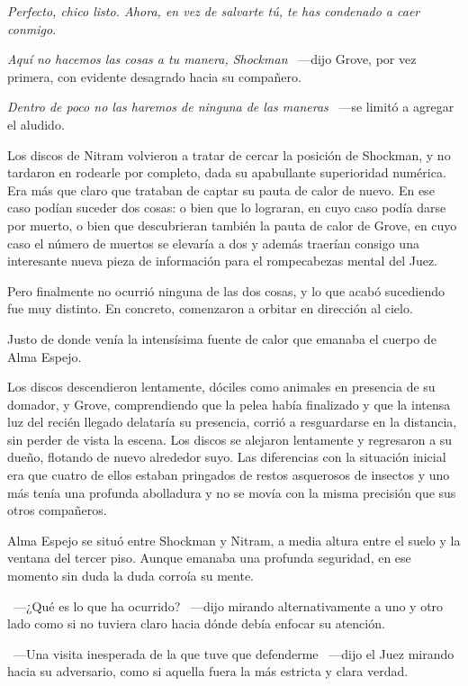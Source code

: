 \emph{Perfecto, chico listo. Ahora, en vez de salvarte tú, te has condenado a caer conmigo.}

\emph{Aquí no hacemos las cosas a tu manera, Shockman} ~---dijo Grove, por vez primera, con evidente desagrado hacia su compañero.

\emph{Dentro de poco no las haremos de ninguna de las maneras} ~---se limitó a agregar el aludido.

Los discos de Nitram volvieron a tratar de cercar la posición de Shockman, y no tardaron en rodearle por completo, dada su apabullante superioridad numérica. Era más que claro que trataban de captar su pauta de calor de nuevo. En ese caso podían suceder dos cosas: o bien que lo lograran, en cuyo caso podía darse por muerto, o bien que descubrieran también la pauta de calor de Grove, en cuyo caso el número de muertos se elevaría a dos y además traerían consigo una interesante nueva pieza de información para el rompecabezas mental del Juez.

Pero finalmente no ocurrió ninguna de las dos cosas, y lo que acabó sucediendo fue muy distinto. En concreto, comenzaron a orbitar en dirección al cielo.

Justo de donde venía la intensísima fuente de calor que emanaba el cuerpo de Alma Espejo.

Los discos descendieron lentamente, dóciles como animales en presencia de su domador, y Grove, comprendiendo que la pelea había finalizado y que la intensa luz del recién llegado delataría su presencia, corrió a resguardarse en la distancia, sin perder de vista la escena. Los discos se alejaron lentamente y regresaron a su dueño, flotando de nuevo alrededor suyo. Las diferencias con la situación inicial era que cuatro de ellos estaban pringados de restos asquerosos de insectos y uno más tenía una profunda abolladura y no se movía con la misma precisión que sus otros compañeros.

Alma Espejo se situó entre Shockman y Nitram, a media altura entre el suelo y la ventana del tercer piso. Aunque emanaba una profunda seguridad, en ese momento sin duda la duda corroía su mente.

~---¿Qué es lo que ha ocurrido? ~---dijo mirando alternativamente a uno y otro lado como si no tuviera claro hacia dónde debía enfocar su atención.
    
~---Una visita inesperada de la que tuve que defenderme ~---dijo el Juez mirando hacia su adversario, como si aquella fuera la más estricta y clara verdad.

